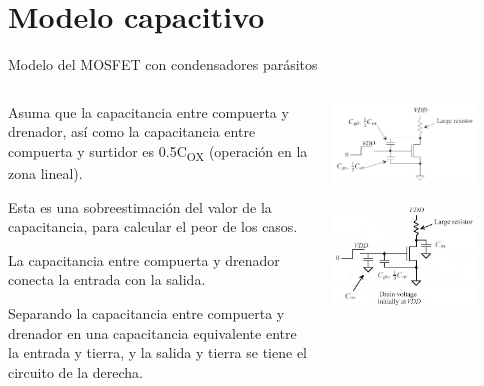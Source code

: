 \documentclass[t,aspectratio=169]{beamer}
\begin{document}
\section{Modelo capacitivo}
\begin{frame}{Modelo del MOSFET con condensadores parásitos}

\vspace{-5mm}
\begin{columns}

\begin{column}{0.5\textwidth}

Asuma que la capacitancia entre compuerta y drenador, así como la capacitancia entre compuerta y surtidor es 0.5C\textsubscript{OX} (operación en la zona lineal).

\vspace{3mm}
Esta es una sobreestimación del valor de la capacitancia, para calcular el peor de los casos.

\vspace{3mm}
La capacitancia entre compuerta y drenador conecta la entrada con la salida.

\vspace{3mm}
Separando la capacitancia entre compuerta y drenador en una capacitancia equivalente entre la entrada y tierra, y la salida y tierra se tiene el circuito de la derecha.

\end{column}

\begin{column}{0.5\textwidth}

\centering
\includegraphics[width=0.8\textwidth]{figuras/mosfet_capacitancias_cgs_cgd.png}

\includegraphics[width=0.8\textwidth]{figuras/digital5.png}


\end{column}
\end{columns}
\end{frame}
\end{document}
